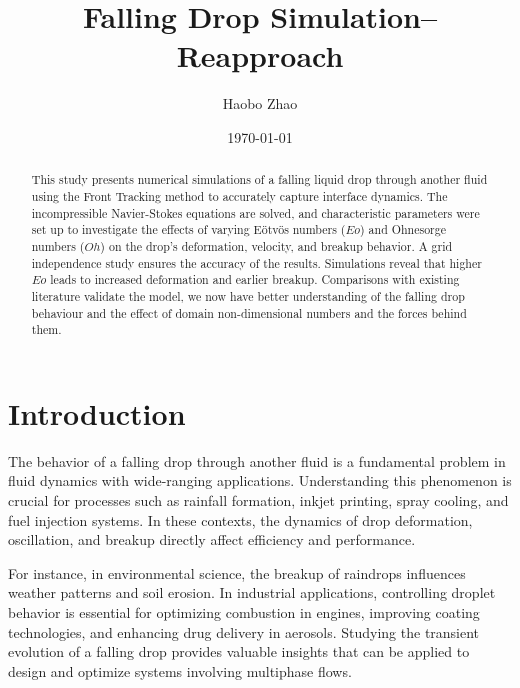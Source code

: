 \documentclass[12pt]{article}
\title{Falling Drop Simulation--Reapproach}
\author{Haobo Zhao}
\date{\today}
\begin{document}
\maketitle


\begin{abstract}
This study presents numerical simulations of a falling liquid drop through another fluid using the Front Tracking method to accurately capture interface dynamics. The incompressible Navier-Stokes equations are solved, and characteristic parameters were set up to investigate the effects of varying Eötvös numbers ($Eo$) and Ohnesorge numbers ($Oh$) on the drop's deformation, velocity, and breakup behavior. A grid independence study ensures the accuracy of the results. Simulations reveal that higher $Eo$ leads to increased deformation and earlier breakup. Comparisons with existing literature validate the model, we now have better understanding of the falling drop behaviour and the effect of domain non-dimensional numbers and the forces behind them.
\end{abstract}



\section{Introduction}

The behavior of a falling drop through another fluid is a fundamental problem in fluid dynamics with wide-ranging applications. Understanding this phenomenon is crucial for processes such as rainfall formation, inkjet printing, spray cooling, and fuel injection systems. In these contexts, the dynamics of drop deformation, oscillation, and breakup directly affect efficiency and performance.

For instance, in environmental science, the breakup of raindrops influences weather patterns and soil erosion. In industrial applications, controlling droplet behavior is essential for optimizing combustion in engines, improving coating technologies, and enhancing drug delivery in aerosols. Studying the transient evolution of a falling drop provides valuable insights that can be applied to design and optimize systems involving multiphase flows.
\end{document}
